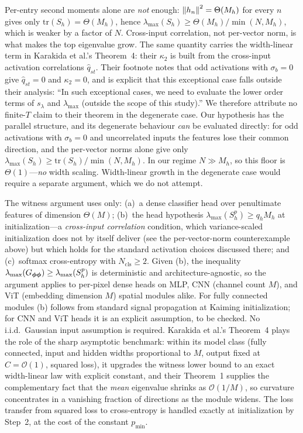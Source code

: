Per-entry second moments alone are \emph{not} enough:
$\left\lVert h_n\right\rVert^2 = \Theta(M_h)$ for every $n$ gives only
$\mathrm{tr}(S_h) = \Theta(M_h)$, hence
$\lambda_{\max}(S_h) \geq \Theta(M_h)/\min(N, M_h)$, which is weaker by a
factor of $N$. Cross-input correlation, not per-vector norm, is what makes
the top eigenvalue grow. The same quantity carries the width-linear term in
Karakida et al.'s Theorem~4: their $\kappa_2$ is built from the cross-input
activation correlations $\hat{q}_{st}$. Their footnote notes that odd
activations with $\sigma_b = 0$ give $\hat{q}_{st} = 0$ and $\kappa_2 = 0$,
and is explicit that this exceptional case falls outside their analysis:
``In such exceptional cases, we need to evaluate the lower order terms of
$s_\lambda$ and $\lambda_{\max}$ (outside the scope of this study).'' We
therefore attribute no finite-$T$ claim to their theorem in the degenerate
case. Our hypothesis has the parallel structure, and its degenerate
behaviour \emph{can} be evaluated directly: for odd activations with
$\sigma_b = 0$ and uncorrelated inputs the features lose their common
direction, and the per-vector norms alone give only
$\lambda_{\max}(S_h) \geq \mathrm{tr}(S_h)/\min(N, M_h)$. In our regime
$N \gg M_h$, so this floor is $\Theta(1)$---\emph{no} width scaling.
Width-linear growth in the degenerate case would require a separate
argument, which we do not attempt.

\begin{remark}
\label{rem:meanfield_scope}
The witness argument uses only: (a)~a dense classifier head over penultimate
features of dimension $\Theta(M)$; (b)~the head hypothesis
$\lambda_{\max}(S_h^{p}) \geq q_h M_h$ at initialization---a
\emph{cross-input correlation} condition, which variance-scaled
initialization does not by itself deliver (see the per-vector-norm
counterexample above) but which holds for the standard activation choices
discussed there; and (c)~softmax cross-entropy with
$N_{\mathrm{cls}} \geq 2$. Given (b), the inequality
$\lambda_{\max}(G_{{\boldsymbol{\phi}}{\boldsymbol{\phi}}}) \geq \lambda_{\max}(S_h^{p})$ is
deterministic and architecture-agnostic, so the argument applies to
per-pixel dense heads on MLP, CNN (channel count $M$), and ViT (embedding
dimension $M$) spatial modules alike. For fully connected modules (b)
follows from standard signal propagation at Kaiming initialization; for CNN
and ViT heads it is an explicit assumption, to be checked. No i.i.d.\
Gaussian input assumption is required. Karakida et al.'s Theorem~4 plays the
role of the sharp asymptotic benchmark: within its model class (fully
connected, input and hidden widths proportional to $M$, output fixed at
$C = \mathcal{O}(1)$, squared loss), it upgrades the witness lower bound to
an exact width-linear law with explicit constant, and their Theorem~1
supplies the complementary fact that the \emph{mean} eigenvalue shrinks as
$\mathcal{O}(1/M)$, so curvature concentrates in a vanishing fraction of
directions as the module widens. The loss transfer from squared loss to
cross-entropy is handled exactly at initialization by Step~2, at the cost of
the constant $p_{\min}$.
\end{remark}

